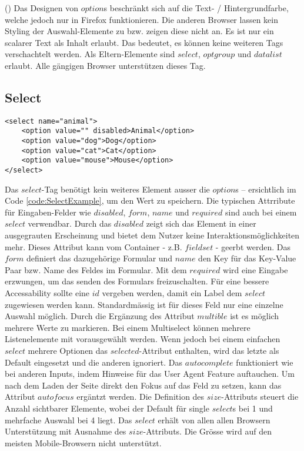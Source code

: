 (\cite{optionMdn}) Das Designen von $option$s beschränkt sich auf die Text- / Hintergrundfarbe, welche jedoch nur in Firefox funktionieren. 
Die anderen Browser lassen kein Styling der Auswahl-Elemente zu bzw. zeigen diese nicht an.
Es ist nur ein scalarer Text als Inhalt erlaubt. 
Das bedeutet, es können keine weiteren Tags verschachtelt werden.
Als Eltern-Elemente sind $select$, $optgroup$ und $datalist$ erlaubt.
Alle gängigen Browser unterstützen dieses Tag.



\subsection{Select}

\begin{lstlisting}[style = htmlcssjs, caption = Select Example, label = code:SelectExample]
<select name="animal">
    <option value="" disabled>Animal</option>
    <option value="dog">Dog</option>
    <option value="cat">Cat</option>
    <option value="mouse">Mouse</option>
</select>
\end{lstlisting}

Das $select$-Tag benötigt kein weiteres Element ausser die $option$s – ersichtlich im Code \ref{code:SelectExample}, um den Wert zu speichern.
Die typischen Attrribute für Eingaben-Felder wie $disabled$, $form$, $name$ und $required$ sind auch bei einem $select$ verwendbar.
Durch das $disabled$ zeigt sich das Element in einer ausgegrauten Erscheinung und bietet dem Nutzer keine Interaktionsmöglichkeiten mehr.
Dieses Attribut kann vom Container - z.B. $fieldset$ - geerbt werden.
Das $form$ definiert das dazugehörige Formular und $name$ den Key für das Key-Value Paar bzw. Name des Feldes im Formular. 
Mit dem $required$ wird eine Eingabe erzwungen, um das senden des Formulars freizuschalten.
Für eine bessere Accessability sollte eine $id$ vergeben werden, damit ein Label dem $select$ zugewiesen werden kann.
Standardmässig ist für dieses Feld nur eine einzelne Auswahl möglich.
Durch die Ergänzung des Attribut $multible$ ist es möglich mehrere Werte zu markieren.
Bei einem Multiselect können mehrere Listenelemente mit vorausgewählt werden.
Wenn jedoch bei einem einfachen $select$ mehrere Optionen das $selected$-Attribut enthalten, wird das letzte als Default eingesetzt und die anderen ignoriert.
Das $autocomplete$ funktioniert wie bei anderen Inputs, indem Hinweise für das User Agent Feature auftauchen.
Um nach dem Laden der Seite direkt den Fokus auf das Feld zu setzen, kann das Attribut $autofocus$ ergäntzt werden.
Die Definition des $size$-Attributs steuert die Anzahl sichtbarer Elemente, wobei der Default für single $select$s bei 1 und mehrfache Auswahl bei 4 liegt.
Das $select$ erhält von allen allen Browsern Unterstützung mit Ausnahme des $size$-Attributs.
Die Grösse wird auf den meisten Mobile-Browsern nicht unterstützt.

